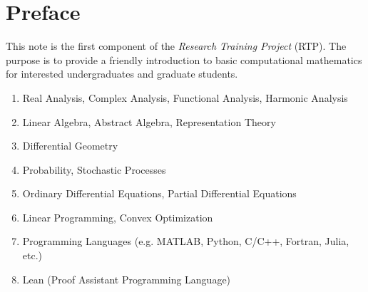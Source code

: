 \chapter*{Preface}

This note is the first component of the \emph{Research Training Project} (RTP).  The purpose is to provide a friendly introduction to basic computational mathematics for interested undergraduates and graduate students. 
\vspace{2cm}

{}

\begin{enumerate}
    \item Real Analysis, Complex Analysis, Functional Analysis, Harmonic Analysis
    \item Linear Algebra, Abstract Algebra, Representation Theory
    \item Differential Geometry
    \item Probability, Stochastic Processes
    \item Ordinary Differential Equations, Partial Differential Equations 
    \item Linear Programming, Convex Optimization
    \item Programming Languages (e.g. MATLAB, Python, C/C++, Fortran, Julia, etc.)
    \item Lean (Proof Assistant Programming Language)
\end{enumerate}
